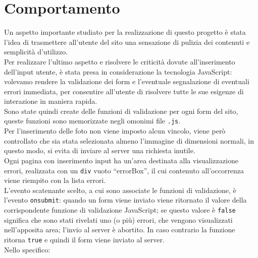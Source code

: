 \section{Comportamento}\label{js}

Un aspetto importante studiato per la realizzazione di questo progetto è stata l'idea di trasmettere all'utente del sito una sensazione di pulizia dei contenuti e semplicità d'utilizzo.\\
Per realizzare l'ultimo aspetto e risolvere le criticità dovute all'inserimento dell'input utente, è stata presa in considerazione la tecnologia JavaScript: volevamo rendere la validazione dei form e l'eventuale segnalazione di eventuali errori immediata, per consentire all'utente di risolvere tutte le sue esigenze di interazione in maniera rapida.\\
Sono state quindi create delle funzioni di validazione per ogni form del sito, queste funzioni sono memorizzate negli omonimi file \texttt{.js}.\\ 
%
Per l'inserimento delle foto non viene imposto alcun vincolo, viene però controllato che sia stata selezionata almeno l'immagine di dimensioni normali, in questo modo, si evita di inviare al server una richiesta inutile.\\
Ogni pagina con inserimento input ha un'area destinata alla visualizzazione errori, realizzata con un \texttt{div} vuoto “errorBox”, il cui contenuto all'occorrenza viene riempito con la lista errori.\\
L'evento scatenante scelto, a cui sono associate le funzioni di validazione, è l'evento \texttt{onsubmit}: quando un form viene inviato viene ritornato il valore della corrispondente funzione di validazione JavaScript; se questo valore è \texttt{false} significa che sono stati rivelati uno (o più) errori, che vengono visualizzati nell'apposita area; l'invio al server è abortito.
In caso contrario la funzione ritorna \texttt{true} e quindi il form viene inviato al server.\\
Nello specifico:
